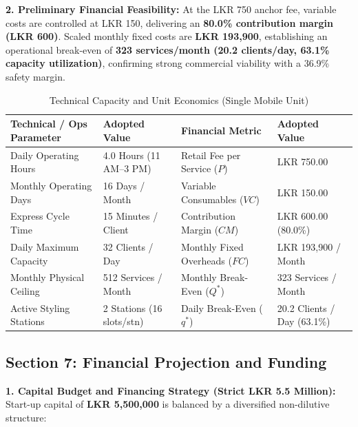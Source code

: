 \documentclass[10.5pt,a4paper]{article}
\begin{document}
\textbf{2. Preliminary Financial Feasibility:}
At the LKR 750 anchor fee, variable costs are controlled at LKR 150, delivering an \textbf{80.0\% contribution margin (LKR 600)}. Scaled monthly fixed costs are \textbf{LKR 193,900}, establishing an operational break-even of \textbf{323 services/month (20.2 clients/day, 63.1\% capacity utilization)}, confirming strong commercial viability with a 36.9\% safety margin.

\begin{table}[htbp]
\centering
\small
\caption{Technical Capacity and Unit Economics (Single Mobile Unit)}
\label{tab:cond_sec4}
\begin{tabularx}{\textwidth}{L{0.27\textwidth}L{0.21\textwidth}L{0.27\textwidth}Y}
\toprule
\textbf{Technical / Ops Parameter} & \textbf{Adopted Value} & \textbf{Financial Metric} & \textbf{Adopted Value} \\
\midrule
Daily Operating Hours & 4.0 Hours (11 AM--3 PM) & Retail Fee per Service ($P$) & LKR 750.00 \\
Monthly Operating Days & 16 Days / Month & Variable Consumables ($VC$) & LKR 150.00 \\
Express Cycle Time & 15 Minutes / Client & Contribution Margin ($CM$) & LKR 600.00 (80.0\%) \\
Daily Maximum Capacity & 32 Clients / Day & Monthly Fixed Overheads ($FC$) & LKR 193,900 / Month \\
Monthly Physical Ceiling & 512 Services / Month & Monthly Break-Even ($Q^*$) & 323 Services / Month \\
Active Styling Stations & 2 Stations (16 slots/stn) & Daily Break-Even ($q^*$) & 20.2 Clients / Day (63.1\%) \\
\bottomrule
\end{tabularx}
\end{table}

\vspace{-0.3em}
\subsection*{Section 7: Financial Projection and Funding}

\textbf{1. Capital Budget and Financing Strategy (Strict LKR 5.5 Million):}
Start-up capital of \textbf{LKR 5,500,000} is balanced by a diversified non-dilutive structure:
\end{document}
